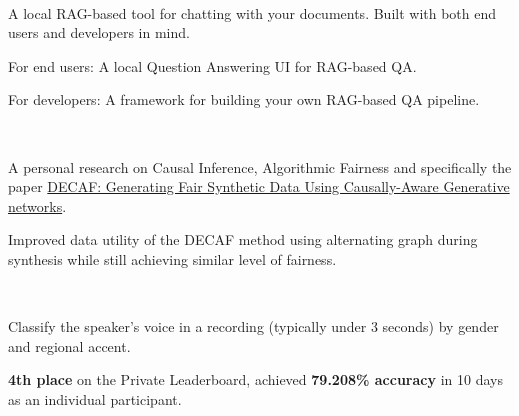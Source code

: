 \\
\begin{zitemize}
    \item A local RAG-based tool for chatting with your documents. Built with both end users and developers in mind.
    \item For end users: A local Question Answering UI for RAG-based QA.
    \item For developers: A framework for building your own RAG-based QA pipeline.
\end{zitemize}


\\
\begin{zitemize}
    \item A personal research on Causal Inference, Algorithmic Fairness and specifically the paper \href{https://arxiv.org/abs/2110.12884}{DECAF: Generating Fair Synthetic Data Using Causally-Aware Generative networks}.
    \item Improved data utility of the DECAF method using alternating graph during synthesis while still achieving similar level of  fairness.
\end{zitemize}

\\
\begin{zitemize}
    \item Classify the speaker's voice in a recording (typically under 3 seconds) by gender and regional accent.
    \item \textbf{4th place} on the Private Leaderboard, achieved \textbf{79.208\%
        accuracy} in 10 days as an individual participant.
\end{zitemize}

